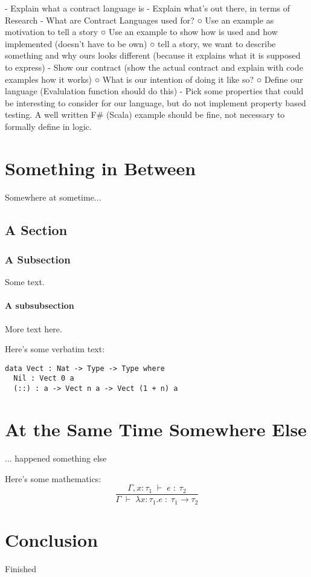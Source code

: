 \documentclass{ituthesis}
\begin{document}
	- Explain what a contract language is
	- Explain what's out there, in terms of Research
	- What are Contract Languages used for?
		○ Use an example as motivation to tell a story
		○ Use an example to show how is used and how implemented (doesn't have to be own)
		○ tell a story, we want to describe something and why ours looks different (because it explains what it is supposed to express)
	- Show our contract (show the actual contract and explain with code examples how it works)
		○ What is our intention of doing it like so?
		○ Define our language (Evalulation function should do this)
	- Pick some properties that could be interesting to consider for our language, but do not implement property based testing.
A well written F# (Scala) example should be fine, not necessary to formally define in logic.

\chapter{Something in Between}
Somewhere at sometime...

\section{A Section}
\subsection{A Subsection}
Some text.
\subsubsection{A subsubsection}
More text here.

Here's some verbatim text:
\begin{verbatim}
data Vect : Nat -> Type -> Type where
  Nil : Vect 0 a
  (::) : a -> Vect n a -> Vect (1 + n) a
\end{verbatim}

\chapter{At the Same Time Somewhere Else}
... happened something else

Here's some mathematics:
\begin{displaymath}
  \frac{
    \Gamma, x:\tau_1\;\vdash\; e \;:\; \tau_2
  }{
    \Gamma\;\vdash\;\lambda x : \tau_1 . e \;:\; \tau_1\to\tau_2}
\end{displaymath}

\chapter{Conclusion}
Finished
\end{document}
